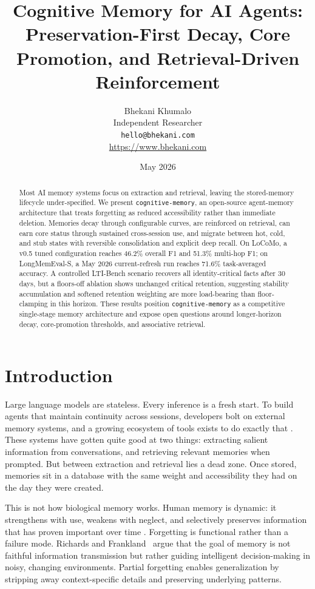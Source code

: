 \documentclass[11pt,a4paper]{article}
\title{Cognitive Memory for AI Agents:\\Preservation-First Decay, Core Promotion, and Retrieval-Driven Reinforcement}
\author{
  Bhekani Khumalo\\
  Independent Researcher\\
  \texttt{hello@bhekani.com}\\
  \url{https://www.bhekani.com}
}
\date{May 2026}
\begin{document}
\maketitle

\begin{abstract}
Most AI memory systems focus on extraction and retrieval, leaving the stored-memory lifecycle under-specified. We present \texttt{cognitive-memory}, an open-source agent-memory architecture that treats forgetting as reduced accessibility rather than immediate deletion. Memories decay through configurable curves, are reinforced on retrieval, can earn core status through sustained cross-session use, and migrate between hot, cold, and stub states with reversible consolidation and explicit deep recall. On LoCoMo, a v0.5 tuned configuration reaches 46.2\% overall F1 and 51.3\% multi-hop F1; on LongMemEval-S, a May 2026 current-refresh run reaches 71.6\% task-averaged accuracy. A controlled LTI-Bench scenario recovers all identity-critical facts after 30 days, but a floors-off ablation shows unchanged critical retention, suggesting stability accumulation and softened retention weighting are more load-bearing than floor-clamping in this horizon. These results position \texttt{cognitive-memory} as a competitive single-stage memory architecture and expose open questions around longer-horizon decay, core-promotion thresholds, and associative retrieval.
\end{abstract}

\section{Introduction}

Large language models are stateless. Every inference is a fresh start. To build agents that maintain continuity across sessions, developers bolt on external memory systems, and a growing ecosystem of tools exists to do exactly that \citep{chhikara2024mem0, packer2023memgpt, sumers2024coala}. These systems have gotten quite good at two things: extracting salient information from conversations, and retrieving relevant memories when prompted. But between extraction and retrieval lies a dead zone. Once stored, memories sit in a database with the same weight and accessibility they had on the day they were created.

This is not how biological memory works. Human memory is dynamic: it strengthens with use, weakens with neglect, and selectively preserves information that has proven important over time \citep{ebbinghaus1885, bjork1992new}. Forgetting is functional rather than a failure mode. Richards and Frankland~\citeyearpar{richards2017persistence} argue that the goal of memory is not faithful information transmission but rather guiding intelligent decision-making in noisy, changing environments. Partial forgetting enables generalization by stripping away context-specific details and preserving underlying patterns.
\end{document}
